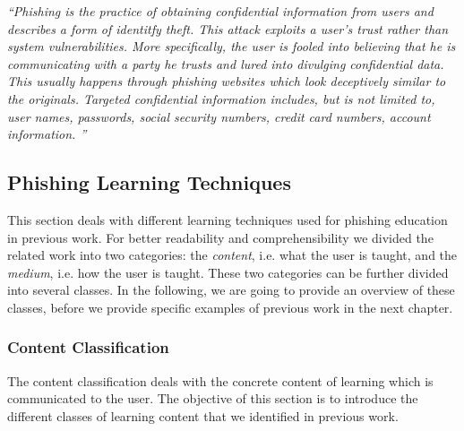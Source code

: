 \begin{center}
\textit{``Phishing is the practice of obtaining confidential information from users and describes a form of identitfy theft. This attack exploits a user's trust rather than system vulnerabilities. More specifically, the user is fooled into believing that he is communicating with a party he trusts and lured into divulging confidential data. This usually happens through phishing websites which look deceptively similar to the originals. Targeted confidential information includes, but is not limited to, user names, passwords, social security numbers, credit card numbers, account information.
''}~\cite{jakobsson2006phishing}
\end{center}

\subsection{Phishing Learning Techniques}

This section deals with different learning techniques used for phishing education in previous work.
 For better readability and comprehensibility we divided the related work into two categories: the \textit{content}, i.e.
 what the user is taught, and the 
\textit{medium}, i.e. how the user is taught.
These two categories can be further divided into several classes. 
In the following, we are going to provide an overview of these classes, before we provide specific examples of previous work in the next chapter.


\subsubsection{Content Classification}
\label{s:content_classification}
The content classification deals with the concrete content of learning which is communicated to the user. 
The objective of this section is to introduce the different classes of learning content that we identified in previous work.

